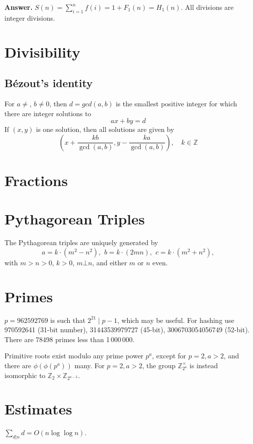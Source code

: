 	\textbf{Answer.}
	$S(n)=\sum_{i=1}^n f(i)=1+F_1(n)=H_1(n)$.
All divisions are integer divisions.


\section{Divisibility}

	\subsection{Bézout's identity}
	For $a \neq $, $b \neq 0$, then $d=gcd(a,b)$ is the smallest positive integer for which there are integer solutions to
	$$ax+by=d$$
	If $(x,y)$ is one solution, then all solutions are given by
	$$\left(x+\frac{kb}{\gcd(a,b)}, y-\frac{ka}{\gcd(a,b)}\right), \quad k\in\mathbb{Z}$$


\section{Fractions}

\section{Pythagorean Triples}
 The Pythagorean triples are uniquely generated by
 \[ a=k\cdot (m^{2}-n^{2}),\ \,b=k\cdot (2mn),\ \,c=k\cdot (m^{2}+n^{2}), \]
 with $m > n > 0$, $k > 0$, $m \bot n$, and either $m$ or $n$ even.

\section{Primes}
	$p=962592769$ is such that $2^{21} \mid p-1$, which may be useful. For hashing
	use 970592641 (31-bit number), 31443539979727 (45-bit), 3006703054056749
	(52-bit). There are 78498 primes less than 1\,000\,000.

	Primitive roots exist modulo any prime power $p^a$, except for $p = 2, a > 2$, and there are $\phi(\phi(p^a))$ many.
	For $p = 2, a > 2$, the group $\mathbb Z_{2^a}^\times$ is instead isomorphic to $\mathbb Z_2 \times \mathbb Z_{2^{a-2}}$.

\section{Estimates}
	$\sum_{d|n} d = O(n \log \log n)$.

